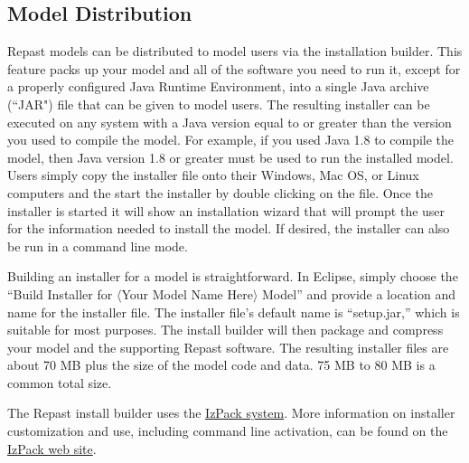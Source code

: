 \documentclass[11pt]{amsart}
\begin{document}
\subsection{Model Distribution}

Repast models can be distributed to model users via the installation builder. This feature packs up your model and all of the software you need to run it, except for a properly configured Java Runtime Environment, into a single Java archive (``JAR") file that can be given to model users. The resulting installer can be executed on any system with a Java version equal to or greater than the version you used to compile the model.  For example, if you used Java 1.8 to compile the model, then Java version 1.8 or greater must be used to run the installed model. Users simply copy the installer file onto their Windows, Mac OS, or Linux computers and the start the installer by double clicking on the file. Once the installer is started it will show an installation wizard that will prompt the user for the information needed to install the model. If desired, the installer can also be run in a command line mode.

Building an installer for a model is straightforward. In Eclipse, simply choose the ``Build Installer for $\langle$Your Model Name Here$\rangle$ Model'' and provide a location and name for the installer file. The installer file's default name is ``setup.jar,'' which is suitable for most purposes. The install builder will then package and compress your model and the supporting Repast software. The resulting installer files are about 70 MB plus the size of the model code and data. 75 MB to 80 MB is a common total size.

The Repast install builder uses the \href{http://izpack.org/}{IzPack system}.  More information on installer customization and use, including command line activation, can be found on the  \href{http://izpack.org/}{IzPack web site}.

\noindent\begin{minipage}[h]{\textwidth}
\vspace{.2in}
\lstset{language=java,caption=}
\begin{lstlisting}

\end{lstlisting}
\vspace{.2in}
\end{minipage}
\end{document}
